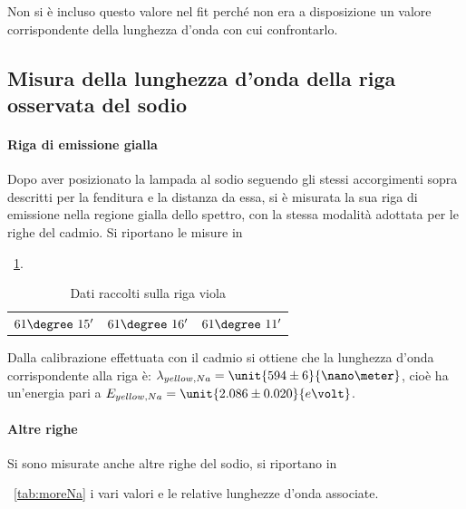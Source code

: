 \documentclass[a4paper,10pt]{article}
\begin{document}
{{{{Non si è incluso questo valore nel fit perché non era a disposizione un valore corrispondente della lunghezza d'onda con cui confrontarlo.

\subsection{Misura della lunghezza d’onda della riga osservata del sodio}

\paragraph{Riga di emissione gialla}
Dopo aver posizionato la lampada al sodio seguendo gli stessi accorgimenti sopra descritti per la fenditura e la distanza da essa, si è misurata la sua riga di emissione nella regione gialla dello spettro, con la stessa modalità adottata per le righe del cadmio.
Si riportano le misure in \tablename{~\ref{tab:gialloNa}.

\begin{table}[H]
	\centering
	\begin{tabular}{c|c|c}
		$61\degree~15'$  & $61\degree~16'$ & $61\degree~11'$\\
	\end{tabular}
	\caption{Dati raccolti sulla riga viola}
	\label{tab:gialloNa}
\end{table}

Dalla calibrazione effettuata con il cadmio si ottiene che la lunghezza d'onda corrispondente alla riga è: $\lambda_{yellow, Na} = \unit{594 \pm 6}{\nano\meter}$, cioè ha un'energia pari a $E_{yellow, Na} = \unit{2.086\pm0.020}{e\volt}$.

\paragraph{Altre righe}

Si sono misurate anche altre righe del sodio, si riportano in \tablename{~\ref{tab:moreNa} i vari valori e le relative lunghezze d'onda associate.

}}}}}}
\end{document}
